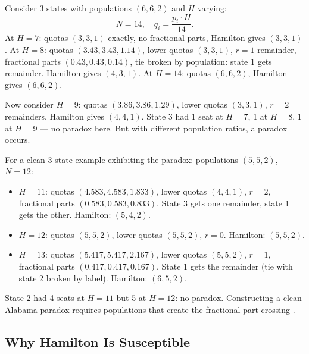 \begin{example}
  Consider 3 states with populations $(6, 6, 2)$ and $H$ varying:
  \[
    N = 14, \quad q_i = \frac{p_i \cdot H}{14}.
  \]
  At $H = 7$: quotas $(3, 3, 1)$ exactly, no fractional parts,
  Hamilton gives $(3, 3, 1)$.
  At $H = 8$: quotas $(3.43, 3.43, 1.14)$, lower quotas $(3, 3, 1)$,
  $r = 1$ remainder, fractional parts $(0.43, 0.43, 0.14)$,
  tie broken by population: state 1 gets remainder.
  Hamilton gives $(4, 3, 1)$.
  At $H = 14$: quotas $(6, 6, 2)$, Hamilton gives $(6, 6, 2)$.

  Now consider $H = 9$: quotas $(3.86, 3.86, 1.29)$, lower quotas $(3, 3, 1)$,
  $r = 2$ remainders.
  Hamilton gives $(4, 4, 1)$.
  State 3 had 1 seat at $H=7$, 1 at $H=8$, 1 at $H=9$ ---
  no paradox here. But with different population ratios, a paradox occurs.

  For a clean 3-state example exhibiting the paradox:
  populations $(5, 5, 2)$, $N = 12$:
  \begin{itemize}
    \item $H = 11$: quotas $(4.583, 4.583, 1.833)$, lower quotas $(4,4,1)$,
      $r=2$, fractional parts $(0.583, 0.583, 0.833)$.
      State 3 gets one remainder, state 1 gets the other.
      Hamilton: $(5, 4, 2)$.
    \item $H = 12$: quotas $(5, 5, 2)$, lower quotas $(5,5,2)$, $r=0$.
      Hamilton: $(5, 5, 2)$.
    \item $H = 13$: quotas $(5.417, 5.417, 2.167)$, lower quotas $(5,5,2)$,
      $r=1$, fractional parts $(0.417, 0.417, 0.167)$.
      State 1 gets the remainder (tie with state 2 broken by label).
      Hamilton: $(6, 5, 2)$.
  \end{itemize}
  State 2 had 4 seats at $H=11$ but 5 at $H=12$: no paradox.
  Constructing a clean Alabama paradox requires populations that create
  the fractional-part crossing \citep{balinski1982fair}.
\end{example}

\subsection{Why Hamilton Is Susceptible}

